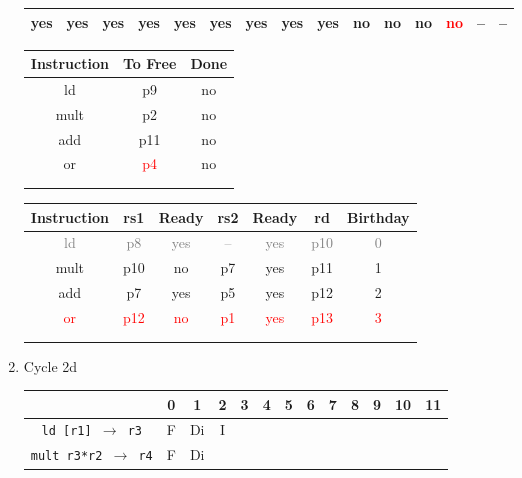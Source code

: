 \documentclass[12pt]{article}
\begin{document}
\begin{enumerate}
\begin{table}[H]
\begin{tabular}{|c|c|c|c|c|c|c|c|c|c|c|c|c|c|c|}
					\hline
					yes & yes & yes & yes & yes & yes & yes & yes & yes & no & no & no & \textcolor{red}{no} & -- & --\\
					\hline
				\end{tabular}
			\end{table}
			\begin{table}[H]
				\begin{tabular}{|c|c|c|}
					\hline
					Instruction & To Free & Done\\
					\hline
					ld & p9 & no\\
					\hline
					mult & p2 & no\\
					\hline
					add & p11 & no\\
					\hline
					or & \textcolor{red}{p4} & no\\
					\hline
					 & & \\
					\hline
					 & & \\
					\hline
				\end{tabular}
				\hfill
				\begin{tabular}{|c|c|c|c|c|c|c|}
					\hline
					Instruction & rs1 & Ready & rs2 & Ready & rd & Birthday\\
					\hline
					\textcolor{gray}{ld} & \textcolor{gray}{p8} & \textcolor{gray}{yes} & \textcolor{gray}{--} & \textcolor{gray}{yes} & \textcolor{gray}{p10} & \textcolor{gray}{0}\\
					\hline
					mult & p10 & no & p7 & yes & p11 & 1\\
					\hline
					add & p7 & yes & p5 & yes & p12 & 2\\
					\hline
					\textcolor{red}{or} & \textcolor{red}{p12} & \textcolor{red}{no} & \textcolor{red}{p1} & \textcolor{red}{yes} & \textcolor{red}{p13} & \textcolor{red}{3}\\
					\hline
					 &  &  &  &  &  & \\
					\hline
					 &  &  &  &  &  & \\
					\hline
				\end{tabular}
			\end{table}
		\item
			Cycle 2d
			\begin{table}[H]
				\begin{tabular}{|c|c|c|c|c|c|c|c|c|c|c|c|c|}
					\hline
					 & 0 & 1 & 2 & 3 & 4 & 5 & 6 & 7 & 8 & 9 & 10 & 11\\
					\hline
					\texttt{ld [r1] $\rightarrow$ r3} & F & Di & I &  &  &  &  &  &  &  &  &\\
					\hline
					\texttt{mult r3*r2 $\rightarrow$ r4} & F & Di &  &  &  &  &  &  &  &  &  &\\

\end{tabular}
\end{table}
\end{enumerate}
\end{document}
